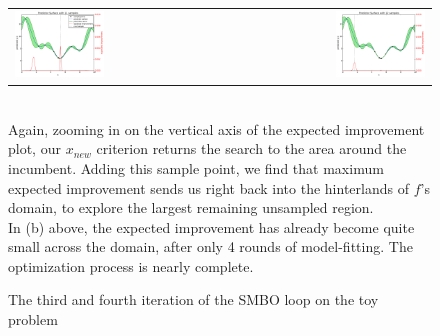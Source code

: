 \begin{figure}[h]
\centering
\begin{tabular}{lr}
\subcaptionbox{}
{\includegraphics[width=0.45\textwidth]{images/ego_ex/3}} &

\subcaptionbox{}
{\includegraphics[width=0.45\textwidth]{images/ego_ex/4}} \\
\end{tabular}
\caption{The third and fourth iteration of the SMBO loop on the toy problem\\}
\label{fig:explore_exploit}

\begin{minipage}{\textwidth}

\ \\Again, zooming in on the vertical axis of the expected improvement plot, our $x_{new}$ criterion returns the search to the area around the incumbent. Adding this sample point, we find that maximum expected improvement sends us right back into the hinterlands of $f$'s domain, to explore the largest remaining unsampled region.\\

In (b) above, the expected improvement has already become quite small across the domain, after only 4 rounds of model-fitting. The optimization process is nearly complete.

\end{minipage}

\end{figure}




